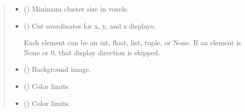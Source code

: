 \documentclass[letterpaper,10pt,english]{sphinxhowto}
\begin{document}
\begin{fulllineitems}
\begin{quote}
\begin{description}
\begin{itemize}
\item {} 
\sphinxAtStartPar
{} (\sphinxstyleliteralemphasis{\sphinxupquote{, }}) \textendash{} Minimum cluster size in voxels.

\item {} 
\sphinxAtStartPar
{} (\sphinxstyleliteralemphasis{\sphinxupquote{, }}\sphinxstyleliteralemphasis{\sphinxupquote{, }}\sphinxstyleliteralemphasis{\sphinxupquote{(}}\sphinxstyleliteralemphasis{\sphinxupquote{, }}\sphinxstyleliteralemphasis{\sphinxupquote{, }}\sphinxstyleliteralemphasis{\sphinxupquote{)}}) \textendash{} 
\sphinxAtStartPar
Cut coordinates for x, y, and z displays.

\sphinxAtStartPar
Each element can be an int, float, list, tuple, or None.
If an element is None or 0, that display direction is skipped.


\item {} 
\sphinxAtStartPar
{} (\sphinxstyleliteralemphasis{\sphinxupquote{, }}\sphinxstyleliteralemphasis{\sphinxupquote{(}}\sphinxstyleliteralemphasis{\sphinxupquote{)}}) \textendash{} Background image.

\item {} 
\sphinxAtStartPar
{} (\sphinxstyleliteralemphasis{\sphinxupquote{, }}) \textendash{} Color limits.

\item {} 
\sphinxAtStartPar
{} (\sphinxstyleliteralemphasis{\sphinxupquote{, }}) \textendash{} Color limits.


\end{itemize}
\end{description}
\end{quote}
\end{fulllineitems}
\end{document}
